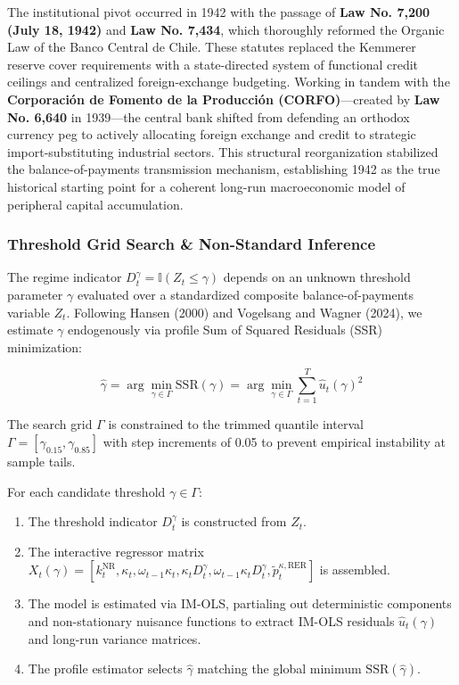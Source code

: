 The institutional pivot occurred in 1942 with the passage of \textbf{Law No. 7,200 (July 18, 1942)} and \textbf{Law No. 7,434}, which thoroughly reformed the Organic Law of the Banco Central de Chile. These statutes replaced the Kemmerer reserve cover requirements with a state-directed system of functional credit ceilings and centralized foreign-exchange budgeting. Working in tandem with the \textbf{Corporación de Fomento de la Producción (CORFO)}---created by \textbf{Law No. 6,640} in 1939---the central bank shifted from defending an orthodox currency peg to actively allocating foreign exchange and credit to strategic import-substituting industrial sectors. This structural reorganization stabilized the balance-of-payments transmission mechanism, establishing 1942 as the true historical starting point for a coherent long-run macroeconomic model of peripheral capital accumulation.

\subsubsection{Threshold Grid Search \& Non-Standard Inference}

The regime indicator $D_t^{\gamma} = \mathbb{I}(Z_t \le \gamma)$ depends on an unknown threshold parameter $\gamma$ evaluated over a standardized composite balance-of-payments variable $Z_t$. Following Hansen (2000) and Vogelsang and Wagner (2024), we estimate $\gamma$ endogenously via profile Sum of Squared Residuals (SSR) minimization:

\begin{equation}
\hat{\gamma} = \arg\min_{\gamma \in \Gamma} \text{SSR}(\gamma) = \arg\min_{\gamma \in \Gamma} \sum_{t=1}^{T} \hat{u}_t(\gamma)^2
\end{equation}

The search grid $\Gamma$ is constrained to the trimmed quantile interval $\Gamma = [\gamma_{0.15}, \gamma_{0.85}]$ with step increments of 0.05 to prevent empirical instability at sample tails.

For each candidate threshold $\gamma \in \Gamma$:
\begin{enumerate}
    \item The threshold indicator $D_t^{\gamma}$ is constructed from $Z_t$.
    \item The interactive regressor matrix $X_t(\gamma) = [k_t^{\text{NR}}, \kappa_t, \omega_{t-1} \kappa_t, \kappa_t D_t^{\gamma}, \omega_{t-1} \kappa_t D_t^{\gamma}, \tilde{p}_t^{\kappa, \text{RER}}]$ is assembled.
    \item The model is estimated via IM-OLS, partialing out deterministic components and non-stationary nuisance functions to extract IM-OLS residuals $\hat{u}_t(\gamma)$ and long-run variance matrices.
    \item The profile estimator selects $\hat{\gamma}$ matching the global minimum $\text{SSR}(\hat{\gamma})$.
\end{enumerate}

